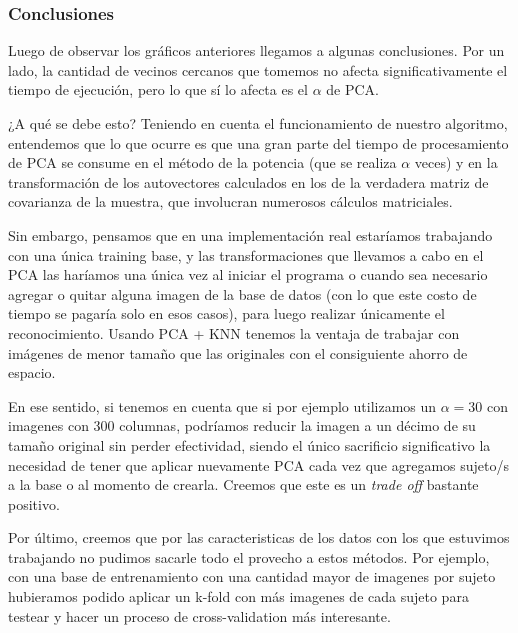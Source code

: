 \subsubsection*{Conclusiones}


Luego de observar los gráficos anteriores llegamos a algunas conclusiones.
Por un lado, la cantidad de vecinos cercanos que tomemos no afecta significativamente el tiempo de ejecución, pero lo que sí lo afecta es el $\alpha$ de PCA.

¿A qué se debe esto? Teniendo en cuenta el funcionamiento de nuestro algoritmo, entendemos que lo que ocurre es que una gran parte del tiempo de procesamiento de PCA se consume en el método de la potencia (que se realiza $\alpha$ veces) y en la transformación de los autovectores calculados en los de la verdadera matriz de covarianza de la muestra, que involucran numerosos cálculos matriciales.\newline

Sin embargo, pensamos que en una implementación real estaríamos trabajando con una única training base, y las transformaciones que llevamos a cabo en el PCA las haríamos una única vez al iniciar el programa o cuando sea necesario agregar o quitar alguna imagen de la base de datos (con lo que este costo de tiempo se pagaría solo en esos casos), para luego realizar únicamente el reconocimiento. Usando PCA + KNN tenemos la ventaja de trabajar con imágenes de menor tamaño que las originales con el consiguiente ahorro de espacio.

En ese sentido, si tenemos en cuenta que si por ejemplo utilizamos un $\alpha = 30$ con imagenes con 300 columnas, podríamos reducir la imagen a un décimo de su tamaño original sin perder efectividad, siendo el único sacrificio significativo la necesidad de tener que aplicar nuevamente PCA cada vez que agregamos sujeto/s a la base o al momento de crearla. Creemos que este es un \textit{trade off} bastante positivo.\newline
 
Por último, creemos que por las caracteristicas de los datos con los que estuvimos trabajando no pudimos sacarle todo el provecho a estos métodos. Por ejemplo, con una base de entrenamiento con una cantidad mayor de imagenes por sujeto hubieramos podido aplicar un k-fold con más imagenes de cada sujeto para testear y hacer un proceso de cross-validation más interesante.